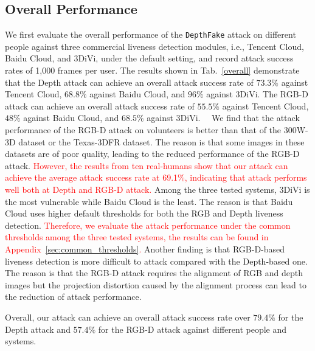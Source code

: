 \subsection{Overall Performance}
\label{sec::overall}
We first evaluate the overall performance of the \texttt{DepthFake}  attack on different people against three commercial liveness detection modules, i.e., Tencent Cloud, Baidu Cloud, and 3DiVi, under the default setting, and record attack success rates of 1,000 frames per user. 
The results shown in Tab.~\ref{overall} demonstrate that the Depth attack can achieve an overall attack success rate of $73.3\%$ against Tencent Cloud, $68.8\%$ against Baidu Cloud, and $96\%$ against 3DiVi. The RGB-D attack can achieve an overall attack success rate of $55.5\%$ against Tencent Cloud, $48\%$ against Baidu Cloud, and $68.5\%$ against 3DiVi.  
We find that the attack performance of the RGB-D attack on volunteers is better than that of the 300W-3D dataset or the Texas-3DFR dataset. The reason is that some images in these  datasets are of poor quality, leading to the reduced performance of the RGB-D attack.
\textcolor{red}{However, the results from ten real-humans show that our attack can achieve the average attack success rate at 69.1\%, indicating that \alias attack performs well both at Depth and RGB-D attack.}
Among the three tested systems, 3DiVi is the most vulnerable while Baidu Cloud is the least. The reason is that Baidu Cloud uses higher default thresholds for both the RGB and Depth liveness detection. 
\textcolor{red}{Therefore, we evaluate the attack performance under the common thresholds among the three tested systems, the results can be found in Appendix~\ref{sec:common_thresholds}.}
Another finding is that RGB-D-based liveness detection is more difficult to attack compared with the Depth-based one. The reason is that the RGB-D attack requires the alignment of RGB and depth images but the projection distortion caused by the alignment process can lead to the reduction of attack performance.

Overall, our attack can achieve an overall attack success rate over $79.4\%$ for the Depth attack and $57.4\%$ for the RGB-D attack against different people and systems.



